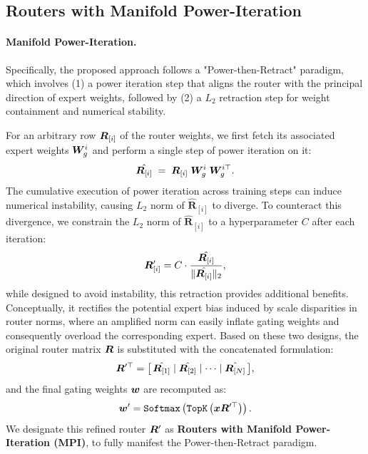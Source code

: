 \documentclass[11pt]{article}
\begin{document}
\subsection{Routers with Manifold Power-Iteration}
\label{sec:definition}
\paragraph{Manifold Power-Iteration.}
Specifically, the proposed approach follows a "Power-then-Retract" paradigm, which involves (1) a power iteration step that aligns the router with the principal direction of expert weights,
followed by (2) a $L_2$ retraction step for weight containment and numerical stability.

For an arbitrary row ${\bm{R}}_{[i]}$ of the router weights, we first fetch its associated expert weights ${\bm{W}}_g^i$  and perform a single step of power iteration on it:
\begin{equation}
    \hat{{\bm{R}}_{[i]}} \; = \; {\bm{R}}_{[i]} \; {\bm{W}}_g^i \; {\bm{W}}_g^{i\top}.
    \label{eq:power}
\end{equation}
The cumulative execution of power iteration across training steps can induce numerical instability, causing $L_2$ norm of $\hat{\mathbf{R}}_{[i]}$ to diverge.
To counteract this divergence, we constrain the $L_2$ norm of $\hat{\mathbf{R}}_{[i]}$ to a hyperparameter $C$ after each iteration:
\begin{equation}
    {\bm{R}}_{[i]}^\prime = C \cdot \frac{\hat{{\bm{R}}_{[i]}}}{\|\hat{{\bm{R}}_{[i]}}\|_2},
\end{equation}
while designed to avoid instability, this retraction provides additional benefits. 
Conceptually, it rectifies the potential expert bias induced by scale disparities in router norms, where an amplified norm can easily inflate gating weights and consequently overload the corresponding expert. 
Based on these two designs, the original router matrix ${\bm{R}}$ is substituted with the concatenated formulation:
\[
    {\bm{R}}^{\prime\top} = \big[ \, \hat{{\bm{R}}_{[1]}} \mid \hat{{\bm{R}}_{[2]}} \mid \cdots \mid \hat{{\bm{R}}_{[N]}} \, \big],
\]
and the final gating weights \({\bm{w}}\) are recomputed as:
\begin{equation}
    {\bm{w}}^\prime = \texttt{Softmax}\left(\texttt{TopK}\left({\bm{x}}{\bm{R}}^{\prime\top}\right)\right).
\end{equation}
We designate this refined router ${\bm{R}}^\prime$ as \textbf{Routers with Manifold Power-Iteration (MPI)}, to fully manifest the Power-then-Retract paradigm.
\end{document}
